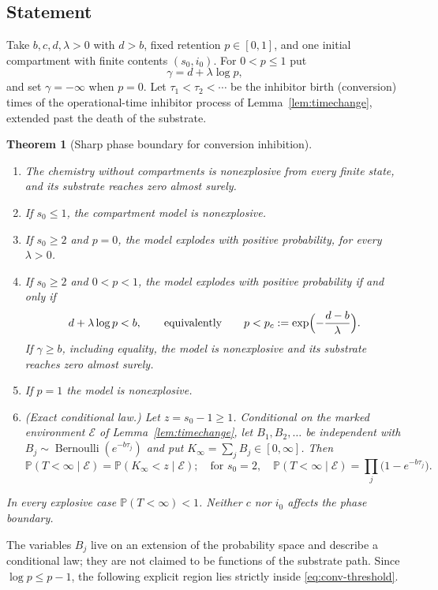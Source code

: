 \documentclass[11pt,a4paper]{article}
\numberwithin{equation}{section}
\newtheorem{theorem}{Theorem}[section]
\theoremstyle{definition}\newtheorem{definition}[theorem]{Definition}
\theoremstyle{remark}\newtheorem{remark}[theorem]{Remark}\newtheorem{example}[theorem]{Example}
\renewcommand{\P}{\mathbb P}
\newcommand{\Ber}{\operatorname{Bernoulli}}
\begin{document}
\subsection{Statement}
Take $b,c,d,\lambda>0$ with $d>b$, fixed retention $p\in[0,1]$, and one initial compartment with finite contents $(s_0,i_0)$. For $0<p\le1$ put
\[
\gamma=d+\lambda\log p,
\]
and set $\gamma=-\infty$ when $p=0$. Let $\tau_1<\tau_2<\cdots$ be the inhibitor birth (conversion) times of the operational-time inhibitor process of Lemma~\ref{lem:timechange}, extended past the death of the substrate.

\begin{theorem}[Sharp phase boundary for conversion inhibition]\label{thm:conversion}
\leavevmode
\begin{enumerate}[label=(\alph*)]
\item The chemistry without compartments is nonexplosive from every finite state, and its substrate reaches zero almost surely.
\item If $s_0\le1$, the compartment model is nonexplosive.
\item If $s_0\ge2$ and $p=0$, the model explodes with positive probability, for every $\lambda>0$.
\item If $s_0\ge2$ and $0<p<1$, the model explodes with positive probability if and only if
\begin{equation}\label{eq:conv-threshold}
d+\lambda\log p<b,\qquad\text{equivalently}\qquad p<p_c:=\exp\Bigl(-\frac{d-b}{\lambda}\Bigr).
\end{equation}
If $\gamma\ge b$, including equality, the model is nonexplosive and its substrate reaches zero almost surely.
\item If $p=1$ the model is nonexplosive.
\item (Exact conditional law.) Let $z=s_0-1\ge1$. Conditional on the marked environment $\mathcal E$ of Lemma~\ref{lem:timechange}, let $B_1,B_2,\dots$ be independent with $B_j\sim\Ber(e^{-b\tau_j})$ and put $K_\infty=\sum_jB_j\in[0,\infty]$. Then
\begin{equation}\label{eq:PB}
\P(T<\infty\mid\mathcal E)=\P(K_\infty<z\mid\mathcal E);\quad\text{for } s_0=2,\quad \P(T<\infty\mid\mathcal E)=\prod_j\bigl(1-e^{-b\tau_j}\bigr).
\end{equation}
\end{enumerate}
In every explosive case $\P(T<\infty)<1$. Neither $c$ nor $i_0$ affects the phase boundary.
\end{theorem}

The variables $B_j$ live on an extension of the probability space and describe a conditional law; they are not claimed to be functions of the substrate path. Since $\log p\le p-1$, the following explicit region lies strictly inside \eqref{eq:conv-threshold}.
\end{document}
